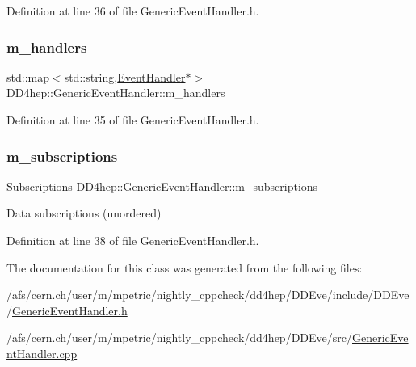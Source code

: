 Definition at line 36 of file Generic\+Event\+Handler.\+h.

\hypertarget{class_d_d4hep_1_1_generic_event_handler_ac699842a86c41b3b4e3424571d83790c}{}\label{class_d_d4hep_1_1_generic_event_handler_ac699842a86c41b3b4e3424571d83790c} 
\subsubsection{\texorpdfstring{m\+\_\+handlers}{m\_handlers}}
{\footnotesize\ttfamily std\+::map$<$std\+::string,\hyperlink{class_d_d4hep_1_1_event_handler}{Event\+Handler}$\ast$$>$ D\+D4hep\+::\+Generic\+Event\+Handler\+::m\+\_\+handlers\hspace{0.3cm}{\ttfamily [protected]}}



Definition at line 35 of file Generic\+Event\+Handler.\+h.

\hypertarget{class_d_d4hep_1_1_generic_event_handler_a3401232a3e8f43d779111f456176a3ba}{}\label{class_d_d4hep_1_1_generic_event_handler_a3401232a3e8f43d779111f456176a3ba} 
\subsubsection{\texorpdfstring{m\+\_\+subscriptions}{m\_subscriptions}}
{\footnotesize\ttfamily \hyperlink{class_d_d4hep_1_1_generic_event_handler_a4b7fd1ba9fc0adab2fa1885162e69076}{Subscriptions} D\+D4hep\+::\+Generic\+Event\+Handler\+::m\+\_\+subscriptions\hspace{0.3cm}{\ttfamily [protected]}}



Data subscriptions (unordered) 



Definition at line 38 of file Generic\+Event\+Handler.\+h.



The documentation for this class was generated from the following files\+:\begin{DoxyCompactItemize}
\item 
/afs/cern.\+ch/user/m/mpetric/nightly\+\_\+cppcheck/dd4hep/\+D\+D\+Eve/include/\+D\+D\+Eve/\hyperlink{_generic_event_handler_8h}{Generic\+Event\+Handler.\+h}\item 
/afs/cern.\+ch/user/m/mpetric/nightly\+\_\+cppcheck/dd4hep/\+D\+D\+Eve/src/\hyperlink{_generic_event_handler_8cpp}{Generic\+Event\+Handler.\+cpp}\end{DoxyCompactItemize}
